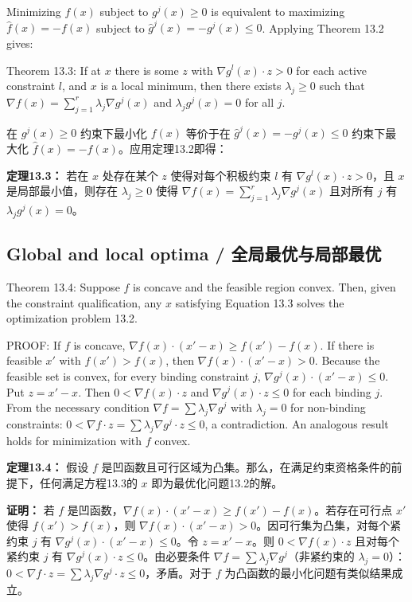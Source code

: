 \begin{original}
Minimizing $f(x)$ subject to $g^j(x) \ge 0$ is equivalent to maximizing $\hat{f}(x) = -f(x)$ subject to $\hat{g}^j(x) = -g^j(x) \le 0$. Applying Theorem 13.2 gives:

Theorem 13.3: If at $x$ there is some $z$ with $\nabla g^l(x) \cdot z > 0$ for each active constraint $l$, and $x$ is a local minimum, then there exists $\lambda_j \ge 0$ such that $\nabla f(x) = \sum_{j=1}^r \lambda_j \nabla g^j(x)$ and $\lambda_j g^j(x) = 0$ for all $j$.
\end{original}
\begin{translation}
在 $g^j(x) \ge 0$ 约束下最小化 $f(x)$ 等价于在 $\hat{g}^j(x) = -g^j(x) \le 0$ 约束下最大化 $\hat{f}(x) = -f(x)$。应用定理13.2即得：

\textbf{定理13.3：} 若在 $x$ 处存在某个 $z$ 使得对每个积极约束 $l$ 有 $\nabla g^l(x) \cdot z > 0$，且 $x$ 是局部最小值，则存在 $\lambda_j \ge 0$ 使得 $\nabla f(x) = \sum_{j=1}^r \lambda_j \nabla g^j(x)$ 且对所有 $j$ 有 $\lambda_j g^j(x) = 0$。
\end{translation}

\subsection{Global and local optima / 全局最优与局部最优}

\begin{original}
Theorem 13.4: Suppose $f$ is concave and the feasible region convex. Then, given the constraint qualification, any $x$ satisfying Equation 13.3 solves the optimization problem 13.2.

PROOF: If $f$ is concave, $\nabla f(x) \cdot (x' - x) \ge f(x') - f(x)$. If there is feasible $x'$ with $f(x') > f(x)$, then $\nabla f(x) \cdot (x' - x) > 0$. Because the feasible set is convex, for every binding constraint $j$, $\nabla g^j(x) \cdot (x' - x) \le 0$. Put $z = x' - x$. Then $0 < \nabla f(x) \cdot z$ and $\nabla g^j(x) \cdot z \le 0$ for each binding $j$. From the necessary condition $\nabla f = \sum \lambda_j \nabla g^j$ with $\lambda_j = 0$ for non-binding constraints: $0 < \nabla f \cdot z = \sum \lambda_j \nabla g^j \cdot z \le 0$, a contradiction. An analogous result holds for minimization with $f$ convex.
\end{original}
\begin{translation}
\textbf{定理13.4：} 假设 $f$ 是凹函数且可行区域为凸集。那么，在满足约束资格条件的前提下，任何满足方程13.3的 $x$ 即为最优化问题13.2的解。

\textbf{证明：} 若 $f$ 是凹函数，$\nabla f(x) \cdot (x' - x) \ge f(x') - f(x)$。若存在可行点 $x'$ 使得 $f(x') > f(x)$，则 $\nabla f(x) \cdot (x' - x) > 0$。因可行集为凸集，对每个紧约束 $j$ 有 $\nabla g^j(x) \cdot (x' - x) \le 0$。令 $z = x' - x$。则 $0 < \nabla f(x) \cdot z$ 且对每个紧约束 $j$ 有 $\nabla g^j(x) \cdot z \le 0$。由必要条件 $\nabla f = \sum \lambda_j \nabla g^j$（非紧约束的 $\lambda_j = 0$）：$0 < \nabla f \cdot z = \sum \lambda_j \nabla g^j \cdot z \le 0$，矛盾。对于 $f$ 为凸函数的最小化问题有类似结果成立。
\end{translation}

